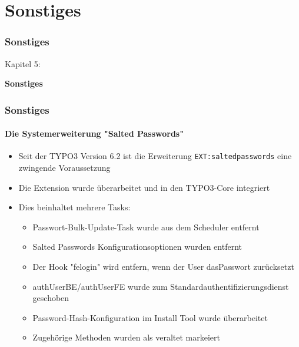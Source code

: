%

\section{Sonstiges}
\begin{frame}[fragile]
	\frametitle{Sonstiges}

	\begin{center}\huge{Kapitel 5:}\end{center}
	\begin{center}\huge{\color{typo3darkgrey}\textbf{Sonstiges}}\end{center}

\end{frame}

%

\begin{frame}[fragile]
	\frametitle{Sonstiges}
	\framesubtitle{Die Systemerweiterung "Salted Passwords"}

	\begin{itemize}
        \item Seit der TYPO3 Version 6.2 ist die Erweiterung \texttt{EXT:saltedpasswords}
            eine zwingende Voraussetzung
		\item Die Extension wurde überarbeitet und in den TYPO3-Core integriert

		\item Dies beinhaltet mehrere Tasks:

			\begin{itemize}
		        \item Passwort-Bulk-Update-Task wurde aus dem Scheduler entfernt
				\item Salted Passwords Konfigurationsoptionen wurden entfernt
				\item Der Hook "felogin" wird entfern, wenn der User dasPasswort zurücksetzt
				\item authUserBE/authUserFE wurde zum Standardauthentifizierungsdienst geschoben
				\item Password-Hash-Konfiguration im Install Tool wurde überarbeitet
				\item Zugehörige Methoden wurden als veraltet markeiert
			\end{itemize}

	\end{itemize}

\end{frame}

